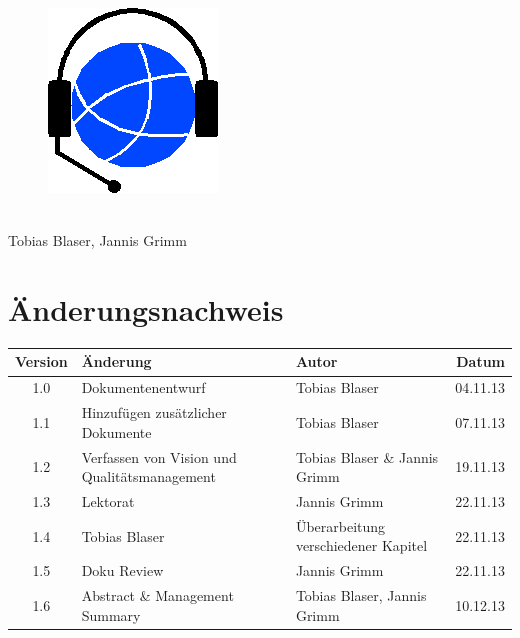 
\usepackage{csvsimple}

\providecommand{\documentType}{Projektdokumentation}
\providecommand{\versionnumber}{1.6}



\thispagestyle{empty}
\begin{titlepage}
	\begin{center}

	\vspace*{40mm}
	
	\begin{figure}[htp]
		\centering
		\includegraphics[scale=0.60]{../img/icon-js-voip.png}
	\end{figure}		
	\vspace*{20mm}
	
	{\fontsize{40}{48} \selectfont \project \\[10mm]}
	\vspace*{20mm}
	Tobias Blaser, Jannis Grimm

\end{center}
\end{titlepage}
\clearpage

\chapter*{Änderungsnachweis}
\begin{tabularx}{\textwidth}{|cXlr|} %
		\hline
		\textbf{Version} & \textbf{Änderung} & \textbf{Autor} & \textbf{Datum}\\
		\hline
		1.0 & Dokumentenentwurf & Tobias Blaser & 04.11.13\\
		1.1 & Hinzufügen zusätzlicher Dokumente & Tobias Blaser & 07.11.13\\
		1.2 & Verfassen von Vision und Qualitätsmanagement & Tobias Blaser \& Jannis Grimm & 19.11.13\\
		1.3 & Lektorat & Jannis Grimm & 22.11.13\\
		1.4 & Tobias Blaser & Überarbeitung verschiedener Kapitel & 22.11.13\\
		1.5 & Doku Review & Jannis Grimm & 22.11.13\\
		\versionnumber & Abstract \& Management Summary & Tobias Blaser, Jannis Grimm & 10.12.13\\
		\hline
\end{tabularx}

